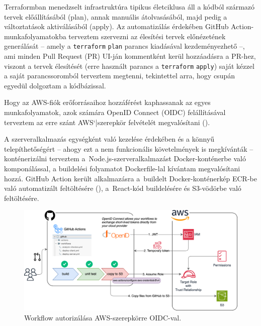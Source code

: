 Terraformban menedzselt infrastruktúra tipikus életciklusa áll a kódból származó tervek előállításából (plan), annak manuális átolvasásából, majd pedig a változtatások aktiválásából (apply). Az automatizálás érdekében GitHub Action-munkafolyamatokba terveztem szervezni az élesítési tervek előnézetének generálását -- amely a \verb|terraform| \verb|plan| parancs kiadásával kezdeményezhető --, ami minden Pull Request (PR) UI-ján kommentként kerül hozzáadásra a PR-hez, viszont a tervek élesítését (erre használt parancs a \verb|terraform| \verb|apply|) saját kézzel a saját parancssoromból terveztem megtenni, tekintettel arra, hogy csupán egyedül dolgoztam a kódbázissal.

Hogy az AWS-fiók erőforrásaihoz hozzáférést kaphassanak az egyes munkafolyamatok, azok számára OpenID Connect (OIDC) felállításával terveztem az erre szánt AWS`|szerepkör felvételét megvalósítani ().\cite{githuboidc}

A szerveralkalmazás egységként való kezelése érdekében és a könnyű telepíthetőségért -- ahogy ezt a nem funkcionális követelmények is megkívánták -- konténerizálni terveztem a~Node.js-szerveralkalmazást Docker-konténerbe való komponálással, a buildelési folyamatot Dockerfile-lal kívántam megvalósítani hozzá. GitHub Action került alkalmazásra a~buildelt Docker-konténerkép ECR-be való automatizált feltöltésére (), a~React-kód buildelésére és S3-vödörbe való feltöltésére.

\vspace{1cm}

\begin{figure}[h]
	\centering
	\includegraphics[width=150mm, keepaspectratio]{figures/githuboidc.png}
	\caption{Workflow autorizálása AWS-szerepkörre OIDC-val.}
	\label{fig:githuboidc}
\end{figure}

\vspace{1cm}

